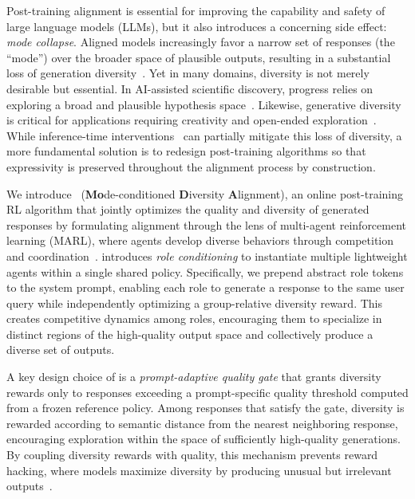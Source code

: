 Post-training alignment is essential for improving the capability and safety of large language models (LLMs), but it also introduces a concerning side effect: \textit{mode collapse}. Aligned models increasingly favor a narrow set of responses (the ``mode'') over the broader space of plausible outputs, resulting in a substantial loss of generation diversity~\citep{jiang2025artificialhivemindopenendedhomogeneity, west2025base, huang2024self, sourati2026homogenizingeffectlargelanguage}. Yet in many domains, diversity is not merely desirable but essential. In AI-assisted scientific discovery, progress relies on exploring a broad and plausible hypothesis space~\citep{gruver2023proteindesignguideddiscrete, romera2024mathematical}. Likewise, generative diversity is critical for applications requiring creativity and open-ended exploration~\citep{Shumailov2024AIMC, abdulhai2026llmsdistortwrittenlanguage}. While inference-time interventions~\citep{Misaki2026, Zhang2025} can partially mitigate this loss of diversity, a more fundamental solution is to redesign post-training algorithms so that expressivity is preserved throughout the alignment process by construction.

We introduce \method~(\textbf{Mo}de-conditioned \textbf{D}iversity \textbf{A}lignment), an online post-training RL algorithm that jointly optimizes the quality and diversity of generated responses by formulating alignment through the lens of multi-agent reinforcement learning (MARL), where agents develop diverse behaviors through competition and coordination~\citep{eysenbach2018diversityneedlearningskills,liang2024learning,li2021celebratingdiversitysharedmultiagent}. \method{} introduces \textit{role conditioning} to instantiate multiple lightweight agents within a single shared policy. Specifically, we prepend abstract role tokens to the system prompt, enabling each role to generate a response to the same user query while independently optimizing a group-relative diversity reward. This creates competitive dynamics among roles, encouraging them to specialize in distinct regions of the high-quality output space and collectively produce a diverse set of outputs.

A key design choice of \method{} is a \textit{prompt-adaptive quality gate} that grants diversity rewards only to responses exceeding a prompt-specific quality threshold computed from a frozen reference policy. Among responses that satisfy the gate, diversity is rewarded according to semantic distance from the nearest neighboring response, encouraging exploration within the space of sufficiently high-quality generations. By coupling diversity rewards with quality, this mechanism prevents reward hacking, where models maximize diversity by producing unusual but irrelevant outputs~\citep{li2025jointlyreinforcingdiversityquality}.

